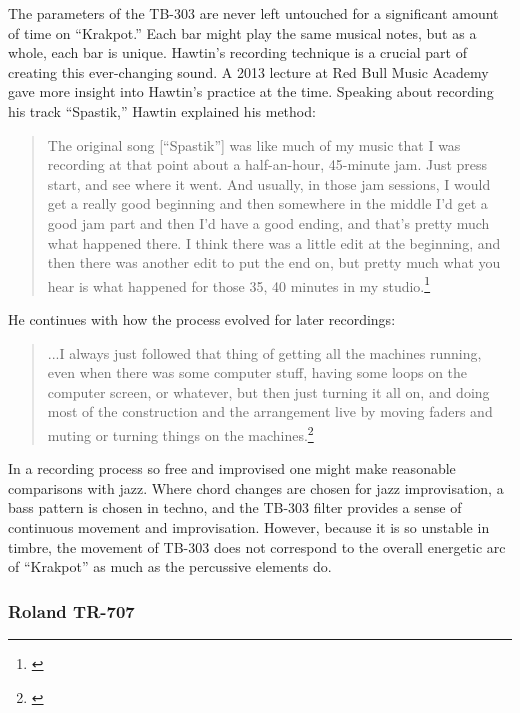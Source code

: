 \documentclass[12pt,twoside]{reedthesis}
\begin{document}
The parameters of the TB-303 are never left untouched for a significant amount of time on ``Krakpot.'' Each bar might play the same musical notes, but as a whole, each bar is unique. Hawtin's recording technique is a crucial part of creating this ever-changing sound. A 2013 lecture at Red Bull Music Academy gave more insight into Hawtin's practice at the time. Speaking about recording his track ``Spastik,'' Hawtin explained his method:
\begin{quote}
	The original song [``Spastik''] was like much of my music that I was recording at that point about a half-an-hour, 45-minute jam. Just press start, and see where it went. And usually, in those jam sessions, I would get a really good beginning and then somewhere in the middle I’d get a good jam part and then I’d have a good ending, and that’s pretty much what happened there. I think there was a little edit at the beginning, and then there was another edit to put the end on, but pretty much what you hear is what happened for those 35, 40 minutes in my studio.\footnote{\cite{burnsRichieHawtinLecture2013}}
\end{quote}
He continues with how the process evolved for later recordings:
\begin{quote}
	...I always just followed that thing of getting all the machines running, even when there was some computer stuff, having some loops on the computer screen, or whatever, but then just turning it all on, and doing most of the construction and the arrangement live by moving faders and muting or turning things on the machines.\footnote{\cite{burnsRichieHawtinLecture2013}}
\end{quote}

In a recording process so free and improvised one might make reasonable comparisons with jazz. Where chord changes are chosen for jazz improvisation, a bass pattern is chosen in techno, and the TB-303 filter provides a sense of continuous movement and improvisation. However, because it is so unstable in timbre, the movement of TB-303 does not correspond to the overall energetic arc of ``Krakpot'' as much as the percussive elements do.

\subsubsection{Roland TR-707}
\end{document}

